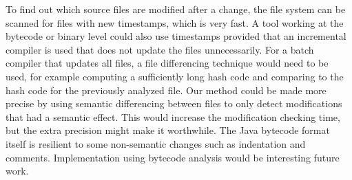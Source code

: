 {\newpage
To find out which source files are modified after a change, the file system can be scanned for files with new timestamps, which is very fast.
A tool working at the bytecode or binary level could also use timestamps provided that an incremental compiler is used that does not update the files unnecessarily.
For a batch compiler that updates all files, a file differencing technique would need to be used,
for example computing a sufficiently long hash code and comparing to the hash code for the previously analyzed file.
Our method could be made more precise by using semantic differencing between files to only detect modifications that had a semantic effect. This would
increase the modification checking time, but the extra precision might make it worthwhile. The Java bytecode format itself is resilient to some non-semantic
changes such as indentation and comments. Implementation using bytecode analysis would be interesting future work.





}
